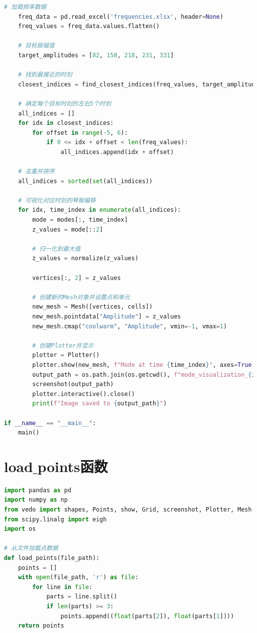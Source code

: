 \documentclass[withoutpreface,bwprint]{cumcmthesis} %
\begin{document}
\begin{appendices}
\begin{lstlisting}[language=Python]
    # 加载频率数据
    freq_data = pd.read_excel('frequencies.xlsx', header=None)
    freq_values = freq_data.values.flatten()

    # 目标振幅值
    target_amplitudes = [82, 158, 218, 231, 331]

    # 找到最接近的时刻
    closest_indices = find_closest_indices(freq_values, target_amplitudes)

    # 确定每个目标时刻的左右5个时刻
    all_indices = []
    for idx in closest_indices:
        for offset in range(-5, 6):
            if 0 <= idx + offset < len(freq_values):
                all_indices.append(idx + offset)

    # 去重并排序
    all_indices = sorted(set(all_indices))

    # 可视化对应时刻的琴板偏移
    for idx, time_index in enumerate(all_indices):
        mode = modes[:, time_index]
        z_values = mode[::2]

        # 归一化到最大值
        z_values = normalize(z_values)

        vertices[:, 2] = z_values

        # 创建新的Mesh对象并设置点和单元
        new_mesh = Mesh([vertices, cells])
        new_mesh.pointdata["Amplitude"] = z_values
        new_mesh.cmap("coolwarm", "Amplitude", vmin=-1, vmax=1)

        # 创建Plotter并显示
        plotter = Plotter()
        plotter.show(new_mesh, f"Mode at time {time_index}", axes=True, interactive=False)
        output_path = os.path.join(os.getcwd(), f"mode_visualization_{idx}.png")
        screenshot(output_path)
        plotter.interactive().close()
        print(f"Image saved to {output_path}")

if __name__ == "__main__":
    main()
\end{lstlisting}
\section{load$\_$points函数}
\begin{lstlisting}[language=Python]
import pandas as pd
import numpy as np
from vedo import shapes, Points, show, Grid, screenshot, Plotter, Mesh
from scipy.linalg import eigh
import os

# 从文件加载点数据
def load_points(file_path):
    points = []
    with open(file_path, 'r') as file:
        for line in file:
            parts = line.split()
            if len(parts) >= 3:
                points.append((float(parts[2]), float(parts[1])))
    return points
\end{lstlisting}

\end{appendices}
\end{document}
